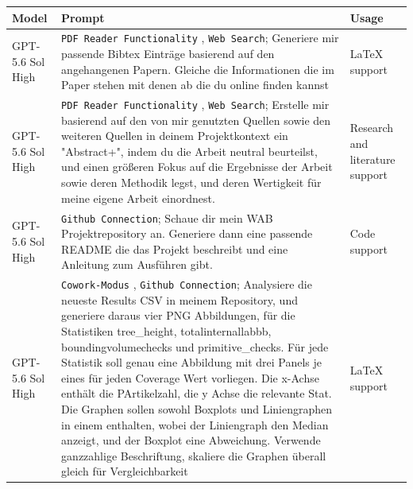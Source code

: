 \newcommand{\sol}{GPT-5.6 Sol High}
\newcommand{\astra}{GPT-6 Astra High}
\newcommand{\usageResearch}{Research and literature support}
\newcommand{\usageLatex}{LaTeX support}
\newcommand{\usageDebugging}{Code support}
\newcommand{\usageWriting}{Wording and sentence-structure support}
\newcommand{\usageReview}{Methodology and Content Review}

\begin{xltabular}{\textwidth}{|>{\raggedright\arraybackslash}p{2.5cm}|>{\raggedright\arraybackslash}X|>{\raggedright\arraybackslash}p{3cm}|}
  \hline
  \textbf{Model} & \textbf{Prompt} & \textbf{Usage} \\
  \hline
  \endfirsthead
  \endhead
  \hline
  \endfoot

  \sol & 
\texttt{PDF Reader Functionality} , \texttt{Web Search}; Generiere mir passende Bibtex Einträge basierend auf den angehangenen Papern. Gleiche die Informationen die im Paper stehen mit denen ab die du online finden kannst &
\usageLatex \\
  \hline

  \sol & 
\texttt{PDF Reader Functionality} , \texttt{Web Search}; Erstelle mir basierend auf den von mir genutzten Quellen sowie den weiteren Quellen in deinem Projektkontext ein "Abstract+", indem du die Arbeit neutral beurteilst, und einen größeren Fokus auf die Ergebnisse der Arbeit sowie deren Methodik legst, und deren Wertigkeit für meine eigene Arbeit einordnest. &
\usageResearch \\
  \hline

  \sol & 
\texttt{Github Connection}; Schaue dir mein WAB Projektrepository an. Generiere dann eine passende README die das Projekt beschreibt und eine Anleitung zum Ausführen gibt. &
\usageDebugging \\
  \hline

  \sol  & 
\texttt{Cowork-Modus} , \texttt{Github Connection}; Analysiere die neueste Results CSV in meinem Repository, und generiere daraus vier PNG Abbildungen, für die Statistiken tree\_height, totalinternallabbb, boundingvolumechecks und primitive\_checks. Für jede Statistik soll genau eine Abbildung mit drei Panels je eines für jeden Coverage Wert vorliegen. Die x-Achse enthält die PArtikelzahl, die y Achse die relevante Stat. Die Graphen sollen sowohl Boxplots und Liniengraphen in einem enthalten, wobei der Liniengraph den Median anzeigt, und der Boxplot eine Abweichung. Verwende ganzzahlige Beschriftung, skaliere die Graphen überall gleich für Vergleichbarkeit &
\usageLatex \\
  \hline


\end{xltabular}

